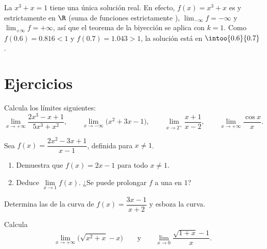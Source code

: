 \begin{example}\label{ex:g12:limcont:cubic}
La  $x^3 + x = 1$ tiene una única solución real. En efecto,
$f(x) = x^3 + x$ es  y estrictamente  en $\R$ (suma de
funciones estrictamente ), $\lim_{-\infty} f = -\infty$ y
$\lim_{+\infty} f = +\infty$, así que el teorema de la biyección se aplica
con $k = 1$. Como $f(0.6) = 0.816 < 1$ y $f(0.7) = 1.043 > 1$, la solución
está en $\intoo{0.6}{0.7}$.
\end{example}

\section{Ejercicios}

\begin{exercise}[$\star$]\label{exo:g12:limcont:1}
Calcula los límites siguientes:
\[
\lim_{x\to+\infty} \frac{2x^3 - x + 1}{5x^3 + x^2}, \qquad
\lim_{x\to-\infty} \bigl(x^2 + 3x - 1\bigr), \qquad
\lim_{x\to 2^+} \frac{x+1}{x-2}, \qquad
\lim_{x\to+\infty} \frac{\cos x}{x}.
\]
\end{exercise}

\begin{exercise}[$\star$]\label{exo:g12:limcont:2}
Sea $f(x) = \dfrac{2x^2 - 3x + 1}{x - 1}$, definida para $x \neq 1$.
\begin{enumerate}
  \item Demuestra que $f(x) = 2x - 1$ para todo $x \neq 1$.
  \item Deduce $\lim\limits_{x \to 1} f(x)$. ¿Se puede prolongar $f$ a una
          en $1$?
\end{enumerate}
\end{exercise}

\begin{exercise}[$\star$]\label{exo:g12:limcont:3}
Determina las  de la curva de $f(x) = \dfrac{3x - 1}{x + 2}$ y
esboza la curva.
\end{exercise}

\begin{exercise}[$\star\star$]\label{exo:g12:limcont:4}
Calcula
\[
\lim_{x\to+\infty} \bigl(\sqrt{x^2 + x} - x\bigr)
\qquad\text{y}\qquad
\lim_{x\to 0} \frac{\sqrt{1+x} - 1}{x}.
\]
\end{exercise}


